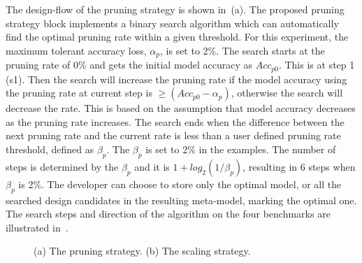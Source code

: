 The design-flow of the pruning strategy is shown in~(a). 
The proposed pruning strategy block implements a binary search algorithm which can automatically find the optimal pruning rate within a given threshold. 
For this experiment, the maximum tolerant accuracy loss, $\alpha_{p}$, is set to 2\%. The search starts at the pruning rate of 0\% and gets the initial model accuracy as $Acc_{p0}$. This is at step 1 (s1). Then the search will increase the pruning rate if the model accuracy using the pruning rate at current step is $\geq (Acc_{p0} - \alpha_{p})$, otherwise the search will decrease the rate. This is based on the assumption that model accuracy decreases as the pruning rate increases.
The search ends when the difference between the next pruning rate and the current rate is less than a user defined pruning rate threshold, defined as $\beta_{p}$. The $\beta_{p}$ is set to 2\% in the examples. 
The number of steps is determined by the $\beta_{p}$ and it is $1+log_{2}(1/\beta_{p})$, resulting in 6 steps when $\beta_{p}$ is 2\%. 
The developer can choose to store only the optimal model, or all the searched design candidates in the resulting meta-model, marking the optimal one. 
The search steps and direction of the algorithm on the four benchmarks are illustrated in~. 


\begin{figure} 
   \centering
   \hspace*{\fill}
   \hspace*{\fill}
  \hspace*{\fill}
  \vspace{0.2cm}
  \caption{(a) The pruning strategy. (b) The scaling strategy. }
  \label{fig:pruning_scaling_strategy} 
\end{figure}




